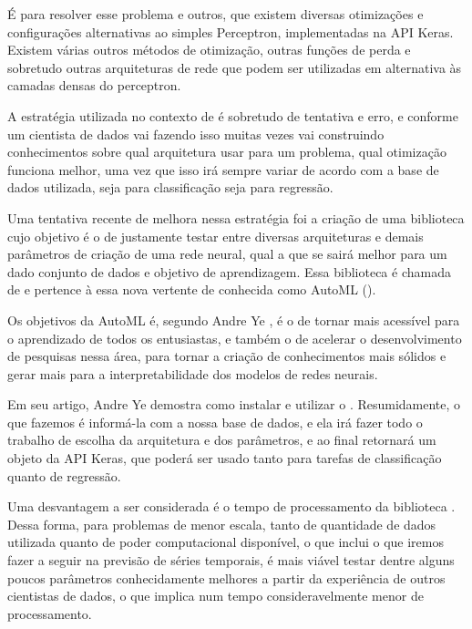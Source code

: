 É para resolver esse problema e outros, que existem diversas otimizações e configurações alternativas ao simples Perceptron, implementadas na API Keras. Existem várias outros métodos de otimização, outras funções de perda e sobretudo outras arquiteturas de rede que podem ser utilizadas em alternativa às camadas densas do perceptron. 

A estratégia utilizada no contexto de  é sobretudo de tentativa e erro, e conforme um cientista de dados vai fazendo isso muitas vezes vai construindo conhecimentos sobre qual arquitetura usar para um problema, qual otimização funciona melhor, uma vez que isso irá sempre variar de acordo com a base de dados utilizada, seja para classificação seja para regressão.

Uma tentativa recente de melhora nessa estratégia foi a criação de uma biblioteca cujo objetivo é o de justamente testar entre diversas arquiteturas e demais parâmetros de criação de uma rede neural, qual a que se sairá melhor para um dado conjunto de dados e objetivo de aprendizagem. Essa biblioteca é chamada de  e pertence à essa nova vertente de  conhecida como AutoML ().

Os objetivos da AutoML é, segundo Andre Ye \citep{automl}, é o de tornar  mais acessível para o aprendizado de todos os entusiastas, e também o de acelerar o desenvolvimento de pesquisas nessa área, para tornar a criação de conhecimentos mais sólidos e gerar mais  para a interpretabilidade dos modelos de redes neurais.

Em seu artigo, Andre Ye \citep{automl} demostra como instalar e utilizar o . Resumidamente, o que fazemos é informá-la com a nossa base de dados, e ela irá fazer todo o trabalho de escolha da arquitetura e dos parâmetros, e ao final retornará um objeto da API Keras, que poderá ser usado tanto para tarefas de classificação quanto de regressão. 

Uma desvantagem a ser considerada é o tempo de processamento da biblioteca . Dessa forma, para problemas de menor escala, tanto de quantidade de dados utilizada quanto de poder computacional disponível, o que inclui o que iremos fazer a seguir na previsão de séries temporais, é mais viável testar dentre alguns poucos parâmetros conhecidamente melhores a partir da experiência de outros cientistas de dados, o que implica num tempo consideravelmente menor de processamento.
